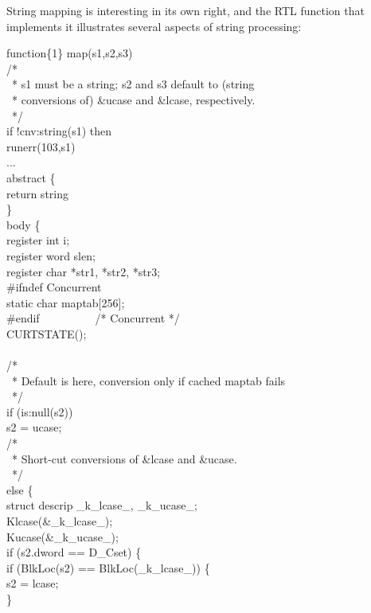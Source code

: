 String mapping is interesting in its own right, and the RTL function
that implements it illustrates several aspects of string processing:

\begin{iconcode}
function\{1\} map(s1,s2,s3)\\
\>/*\\
\>\ * s1 must be a string; s2 and s3 default to (string \\
\>\ * conversions of) \&ucase and \&lcase, respectively.\\
\>\ */\\
\>if !cnv:string(s1) then\\
\>\>runerr(103,s1)\\
\>...\\
\>abstract \{\\
\>\>return string\\
\>\>\}\\
\>body \{\\
\>\>register int i;\\
\>\>register word slen;\\
\>\>register char *str1, *str2, *str3;\\
\#ifndef Concurrent\\
\>\>static char maptab[256];\\
\#endif\ \ \ \ \ \ \ \ \ \ /* Concurrent */\\
\>\>CURTSTATE();\\
\\
\>\>/*\\
\>\>\ * Default is here, conversion only if cached maptab fails\\
\>\>\ */\\
\>\>if (is:null(s2))\\
\>\>\>s2 = ucase;\\
\>\>/*\\
\>\>\ * Short-cut conversions of \&lcase and \&ucase.\\
\>\>\ */\\
\>\>else \{\\
\>\>\>struct descrip \_k\_lcase\_, \_k\_ucase\_;\\
\>\>\>Klcase(\&\_k\_lcase\_);\\
\>\>\>Kucase(\&\_k\_ucase\_);\\
\>\>\>if (s2.dword == D\_Cset) \{\\
\>\>\>\>if (BlkLoc(s2) == BlkLoc(\_k\_lcase\_)) \{\\
\>\>\>\>s2 = lcase;\\
\>\>\>\}\\

\end{iconcode}
